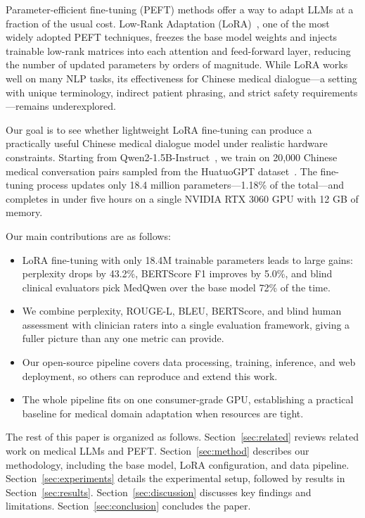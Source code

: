 \documentclass[12pt,a4paper]{article}
\begin{document}
Parameter-efficient fine-tuning (PEFT) methods offer a way to adapt LLMs at a fraction of the usual cost. Low-Rank Adaptation (LoRA)~\cite{hu2021lora}, one of the most widely adopted PEFT techniques, freezes the base model weights and injects trainable low-rank matrices into each attention and feed-forward layer, reducing the number of updated parameters by orders of magnitude. While LoRA works well on many NLP tasks, its effectiveness for Chinese medical dialogue---a setting with unique terminology, indirect patient phrasing, and strict safety requirements---remains underexplored.

Our goal is to see whether lightweight LoRA fine-tuning can produce a practically useful Chinese medical dialogue model under realistic hardware constraints. Starting from Qwen2-1.5B-Instruct~\cite{yang2024qwen2}, we train on 20,000 Chinese medical conversation pairs sampled from the HuatuoGPT dataset~\cite{zhang2023huatuogpt}. The fine-tuning process updates only 18.4 million parameters---1.18\% of the total---and completes in under five hours on a single NVIDIA RTX 3060 GPU with 12 GB of memory.

Our main contributions are as follows:

\begin{itemize}
    \item LoRA fine-tuning with only 18.4M trainable parameters leads to large gains: perplexity drops by 43.2\%, BERTScore F1 improves by 5.0\%, and blind clinical evaluators pick MedQwen over the base model 72\% of the time.
    \item We combine perplexity, ROUGE-L, BLEU, BERTScore, and blind human assessment with clinician raters into a single evaluation framework, giving a fuller picture than any one metric can provide.
    \item Our open-source pipeline covers data processing, training, inference, and web deployment, so others can reproduce and extend this work.
    \item The whole pipeline fits on one consumer-grade GPU, establishing a practical baseline for medical domain adaptation when resources are tight.
\end{itemize}

The rest of this paper is organized as follows. Section~\ref{sec:related} reviews related work on medical LLMs and PEFT. Section~\ref{sec:method} describes our methodology, including the base model, LoRA configuration, and data pipeline. Section~\ref{sec:experiments} details the experimental setup, followed by results in Section~\ref{sec:results}. Section~\ref{sec:discussion} discusses key findings and limitations. Section~\ref{sec:conclusion} concludes the paper.
\end{document}
